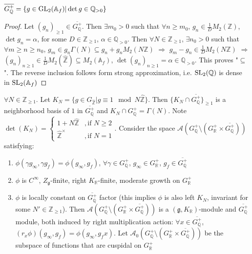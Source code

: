 \documentclass[main]{subfiles}
\begin{document}
\begin{lemma}
$\overline{G_{\mathbb Q}^+}=\{g\in\operatorname{GL}_2(\mathbb A_f)|\det g\in\mathbb Q_{>0}\}$
\end{lemma}

\begin{proof}
Let $(g_n)_{\geq1}\in\overline{G^+_{\mathbb Q}}$. Then $\exists m_0>0$ such that $\forall n\geq m_0$, $g_n\in\frac{1}{D}M_2(\mathbb Z)$, $\det g_n=\alpha$, for some $D\in\mathbb Z_{\geq1}$, $\alpha\in\mathbb Q_{>0}$. Then $\forall N\in\mathbb Z_{\geq1}$, $\exists n_0>0$ such that $\forall m\geq n\geq n_0$, $g_m\in g_n\Gamma(N)\subseteq g_n+g_nM_2(N\mathbb Z)$ $\Rightarrow$ $g_m-g_n\in\frac{1}{D}M_2(N\mathbb Z)$ $\Rightarrow$ $(g_n)_{n\geq1}\in\frac{1}{D}M_2(\hat{\mathbb Z})\subseteq M_2(\mathbb A_f)$, $\det(g_n)_{n\geq1}=\alpha\in\mathbb Q_{>0}$. This proves "$\subseteq$". The reverse inclusion follows form strong approximation, i.e. $\operatorname{SL}_2(\mathbb Q)$ is dense in $\operatorname{SL}_2(\mathbb A_f)$
\end{proof}

$\forall N\in\mathbb Z_{\geq1}$. Let $K_N=\{g\in G_{\hat{\mathbb Z}}|g\equiv 1\mod N\hat{\mathbb Z}\}$. Then $\{K_N\cap\overline{G^+_{\mathbb Q}}\}_{\geq1}$ is a neighborhood basis of $1$ in $\overline{G_{\mathbb Q}^+}$ and $K_N\cap G^+_{\mathbb Q}=\Gamma(N)$. Note $\det(K_N)=\begin{cases}
1+N\hat{\mathbb Z}&,\text{if }N\geq2 \\
\hat{\mathbb Z}^\times&,\text{if }N=1
\end{cases}$. Consider the space $\mathcal A(G^+_{\mathbb Q}\setminus(G_{\mathbb R}^+\times\overline{G_{\mathbb Q}^+}))$ satisfying:
\begin{enumerate}
\item $\phi(\gamma g_\infty,\gamma g_f)=\phi(g_\infty,g_f)$, $\forall\gamma\in G^+_{\mathbb Q}$, $g_\infty\in G^+_{\mathbb R}$, $g_f\in\overline{G_{\mathbb Q}^+}$
\item $\phi$ is $C^\infty$, $Z_{\mathfrak g}$-finite, right $K_{\mathbb R}$-finite, moderate growth on $G_{\mathbb R}^+$
\item $\phi$ is locally constant on $\overline{G^+_{\mathbb Q}}$ factor (this implies $\phi$ is also left $K_N$, invariant for some $N'\in\mathbb Z_{\geq1}$). Then $\mathcal A(G^+_{\mathbb Q}\setminus(G^+_{\mathbb R}\times\overline{G^+_{\mathbb Q}}))$ is a $(\mathfrak g,K_{\mathbb R})$-module and $\overline{G^+_{\mathbb Q}}$ module, both induced by right multiplication action: $\forall x\in\overline{G^+_{\mathbb Q}}$, $(r_x\phi)(g_\infty,g_f)=\phi(g_\infty,g_fx)$. Let $\mathcal A_0(G^+_{\mathbb Q}\setminus(G^+_{\mathbb R}\times\overline{G^+_{\mathbb Q}}))$ be the subspace of functions that are cuspidal on $G^+_{\mathbb R}$
\end{enumerate}
\end{document}
